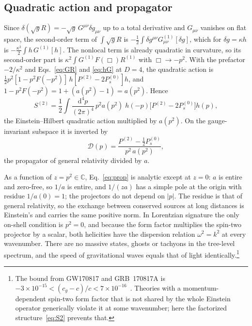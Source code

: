 \documentclass[a4paper,11pt]{article}
\newcommand{\bC}{\mathbb{C}}
\newcommand{\dd}{\mathrm{d}}
\newcommand{\Pt}{P^{(2)}}
\newcommand{\Ps}{P^{(0)}_{s}}
\begin{document}
\subsection{Quadratic action and propagator}
\label{sec:prop}

Since $\delta(\sqrt gR)=-\sqrt g\,G^{\mu\nu}\delta g_{\mu\nu}$ up to a total derivative and $G_{\mu\nu}$ vanishes on flat space, the second-order term of $\int\sqrt gR$ is $-\frac12\int\delta g^{\mu\nu}G^{(1)}_{\mu\nu}[\delta g]$, which for $\delta g=\kappa h$ is $-\frac{\kappa^2}2\int h\,G^{(1)}[h]$. The nonlocal term is already quadratic in curvature, so its second-order part is $\kappa^2\int G^{(1)}F(\Box)R^{(1)}$ with $\Box\to-p^2$. With the prefactor $-2/\kappa^2$ and Eqs.~\eqref{eq:GR} and \eqref{eq:hG} at $D=4$, the quadratic action is $\frac12p^2[1-p^2F(-p^2)]\,h[\Pt-2\Ps]h$, and $1-p^2F(-p^2)=1+(a(p^2)-1)=a(p^2)$. Hence
\begin{equation}
\label{eq:S2}
S^{(2)}=\frac12\int\frac{\dd^4p}{(2\pi)^4}\,p^2a(p^2)\;h(-p)\bigl[\Pt-2\Ps\bigr]h(p),
\end{equation}
the Einstein--Hilbert quadratic action multiplied by $a(p^2)$. On the gauge-invariant subspace it is inverted by
\begin{equation}
\label{eq:prop}
\mathcal D(p)=\frac{\Pt-\frac12\Ps}{p^2\,a(p^2)} ,
\end{equation}
the propagator of general relativity divided by $a$.

As a function of $z=p^2\in\bC$, Eq.~\eqref{eq:prop} is analytic except at $z=0$: $a$ is entire and zero-free, so $1/a$ is entire, and $1/(za)$ has a simple pole at the origin with residue $1/a(0)=1$; the projectors do not depend on $|p|$. The residue is that of general relativity, so the exchange between conserved sources at long distances is Einstein's and carries the same positive norm. In Lorentzian signature the only on-shell condition is $p^2=0$, and because the form factor multiplies the spin-two projector by a scalar, both helicities have the dispersion relation $\omega^2=k^2$ at every wavenumber. There are no massive states, ghosts or tachyons in the tree-level spectrum, and the speed of gravitational waves equals that of light identically.\footnote{The bound from GW170817 and GRB~170817A is $-3\times10^{-15}<(c_g-c)/c<7\times10^{-16}$~\cite{GW170817}. Theories with a momentum-dependent spin-two form factor that is not shared by the whole Einstein operator generically violate it at some wavenumber; here the factorized structure~\eqref{eq:S2} prevents that.}
\end{document}
